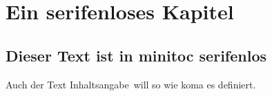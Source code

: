 \documentclass[german,a4paper,oneside]{scrbook}
\begin{document}
\dominitoc \tableofcontents
\chapter{Ein serifenloses Kapitel}
\minitoc %
\section{Dieser Text ist in minitoc serifenlos}
Auch der Text \glqq Inhaltsangabe\grqq\ will
so wie koma es definiert.
\end{document}
